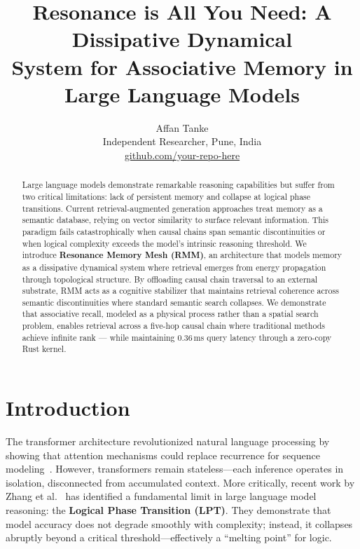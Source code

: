 \documentclass[11pt]{article}
\title{\textbf{Resonance is All You Need: A Dissipative Dynamical\\
System for Associative Memory in Large Language Models}}
\author{Affan Tanke\\
\small Independent Researcher, Pune, India\\
\small \href{https://github.com/your-repo-here}{github.com/your-repo-here}
}
\date{}
\begin{document}
\maketitle

\begin{abstract}
Large language models demonstrate remarkable reasoning capabilities but
suffer from two critical limitations: lack of persistent memory and
collapse at logical phase transitions. Current retrieval-augmented
generation approaches treat memory as a semantic database, relying on
vector similarity to surface relevant information. This paradigm fails
catastrophically when causal chains span semantic discontinuities or
when logical complexity exceeds the model's intrinsic reasoning
threshold. We introduce \textbf{Resonance Memory Mesh (RMM)}, an
architecture that models memory as a dissipative dynamical system where
retrieval emerges from energy propagation through topological structure.
By offloading causal chain traversal to an external substrate, RMM acts
as a cognitive stabilizer that maintains retrieval coherence across
semantic discontinuities where standard semantic search collapses. We
demonstrate that associative recall, modeled as a physical process
rather than a spatial search problem, enables retrieval across a
five-hop causal chain where traditional methods achieve infinite rank ---
while maintaining 0.36\,ms query latency through a zero-copy Rust
kernel.
\end{abstract}

\section{Introduction}

The transformer architecture revolutionized natural language processing
by showing that attention mechanisms could replace recurrence for
sequence modeling~\cite{vaswani2017attention}. However, transformers
remain stateless---each inference operates in isolation, disconnected
from accumulated context. More critically, recent work by Zhang et
al.~\cite{zhang2026lpt} has identified a fundamental limit in large
language model reasoning: the \textbf{Logical Phase Transition (LPT)}.
They demonstrate that model accuracy does not degrade smoothly with
complexity; instead, it collapses abruptly beyond a critical
threshold---effectively a ``melting point'' for logic.
\end{document}
